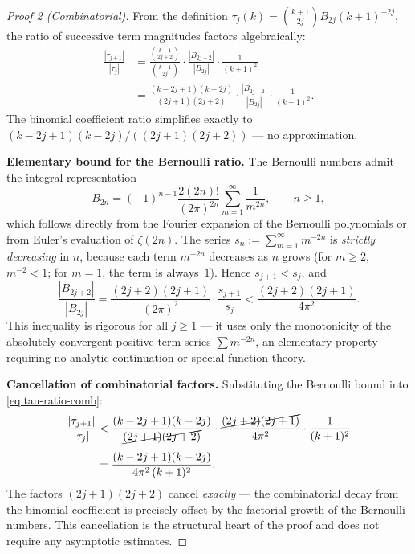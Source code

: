 \documentclass[12pt,a4paper]{article}
\theoremstyle{plain}
\theoremstyle{definition}
\begin{document}
\begin{proof}[Proof 2 (Combinatorial)]
  From the definition $\tau_j(k) = \binom{k+1}{2j} B_{2j} (k+1)^{-2j}$,
  the ratio of successive term magnitudes factors algebraically:
  \begin{align}
    \frac{|\tau_{j+1}|}{|\tau_j|}
    &= \frac{\binom{k+1}{2j+2}}{\binom{k+1}{2j}}
       \cdot \frac{|B_{2j+2}|}{|B_{2j}|}
       \cdot \frac{1}{(k+1)^2} \nonumber \\[6pt]
    &= \frac{(k-2j+1)(k-2j)}{(2j+1)(2j+2)}
       \cdot \frac{|B_{2j+2}|}{|B_{2j}|}
       \cdot \frac{1}{(k+1)^2}. \label{eq:tau-ratio-comb}
  \end{align}
  The binomial coefficient ratio simplifies exactly to
  $(k-2j+1)(k-2j)/((2j+1)(2j+2))$ --- no approximation.

  \medskip
  \noindent\textbf{Elementary bound for the Bernoulli ratio.}
  The Bernoulli numbers admit the integral representation~\cite{Euler}
  \[
    B_{2n} = (-1)^{n-1} \frac{2(2n)!}{(2\pi)^{2n}}
             \sum_{m=1}^{\infty} \frac{1}{m^{2n}},
    \qquad n \ge 1,
  \]
  which follows directly from the Fourier expansion of the Bernoulli
  polynomials or from Euler's evaluation of $\zeta(2n)$.  The series
  $s_n := \sum_{m=1}^{\infty} m^{-2n}$ is \emph{strictly decreasing}
  in $n$, because each term $m^{-2n}$ decreases as $n$ grows
  (for $m \ge 2$, $m^{-2} < 1$; for $m=1$, the term is always~$1$).
  Hence $s_{j+1} < s_j$, and
  \[
    \frac{|B_{2j+2}|}{|B_{2j}|}
    = \frac{(2j+2)(2j+1)}{(2\pi)^2}
      \cdot \frac{s_{j+1}}{s_j}
    < \frac{(2j+2)(2j+1)}{4\pi^2}.
  \]
  This inequality is rigorous for all $j \ge 1$ --- it uses only the
  monotonicity of the absolutely convergent positive-term series
  $\sum m^{-2n}$, an elementary property requiring no analytic
  continuation or special-function theory.

  \medskip
  \noindent\textbf{Cancellation of combinatorial factors.}
  Substituting the Bernoulli bound into \eqref{eq:tau-ratio-comb}:
  \begin{align*}
    \frac{|\tau_{j+1}|}{|\tau_j|}
    &< \frac{(k-2j+1)(k-2j)}{\cancel{(2j+1)(2j+2)}}
       \cdot \frac{\cancel{(2j+2)(2j+1)}}{4\pi^2}
       \cdot \frac{1}{(k+1)^2} \\[4pt]
    &= \frac{(k-2j+1)(k-2j)}{4\pi^2\,(k+1)^2}.
  \end{align*}
  The factors $(2j+1)(2j+2)$ cancel \emph{exactly} --- the combinatorial
  decay from the binomial coefficient is precisely offset by the factorial
  growth of the Bernoulli numbers.  This cancellation is the structural
  heart of the proof and does not require any asymptotic estimates.


\end{proof}
\end{document}
